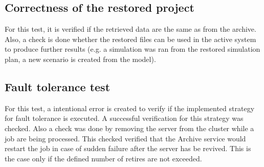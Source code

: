 \subsection{Correctness of the restored project}
For this test, it is verified if the retrieved data are the same as from the archive. Also, a check is done whether the restored files can be used in the active system
to produce further results (e.g. a simulation was ran from the restored simulation plan, a new scenario is created from the model).

\subsection{Fault tolerance test}
For this test, a intentional error is created to verify if the implemented strategy for fault tolerance is executed. A successful verification for this
strategy was checked. Also a check was done by removing the server from the cluster while a job are being processed. This checked verified that the Archive service
would restart the job in case of sudden failure after the server has be revived. This is the case only if the defined number of retires are not exceeded.
